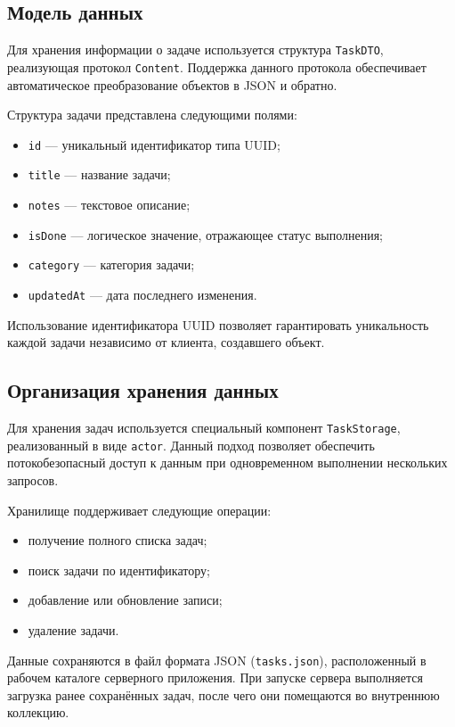 \documentclass[14pt,a4paper]{extarticle}
\begin{document}
\subsection{Модель данных}

Для хранения информации о задаче используется структура \texttt{TaskDTO}, реализующая протокол \texttt{Content}. Поддержка данного протокола обеспечивает автоматическое преобразование объектов в JSON и обратно.

Структура задачи представлена следующими полями:

\begin{itemize}
    \item \texttt{id} --- уникальный идентификатор типа UUID;
    \item \texttt{title} --- название задачи;
    \item \texttt{notes} --- текстовое описание;
    \item \texttt{isDone} --- логическое значение, отражающее статус выполнения;
    \item \texttt{category} --- категория задачи;
    \item \texttt{updatedAt} --- дата последнего изменения.
\end{itemize}

Использование идентификатора UUID позволяет гарантировать уникальность каждой задачи независимо от клиента, создавшего объект.

\subsection{Организация хранения данных}

Для хранения задач используется специальный компонент \texttt{TaskStorage}, реализованный в виде \texttt{actor}. Данный подход позволяет обеспечить потокобезопасный доступ к данным при одновременном выполнении нескольких запросов.

Хранилище поддерживает следующие операции:

\begin{itemize}
    \item получение полного списка задач;
    \item поиск задачи по идентификатору;
    \item добавление или обновление записи;
    \item удаление задачи.
\end{itemize}

Данные сохраняются в файл формата JSON (\texttt{tasks.json}), расположенный в рабочем каталоге серверного приложения. При запуске сервера выполняется загрузка ранее сохранённых задач, после чего они помещаются во внутреннюю коллекцию.
\end{document}
